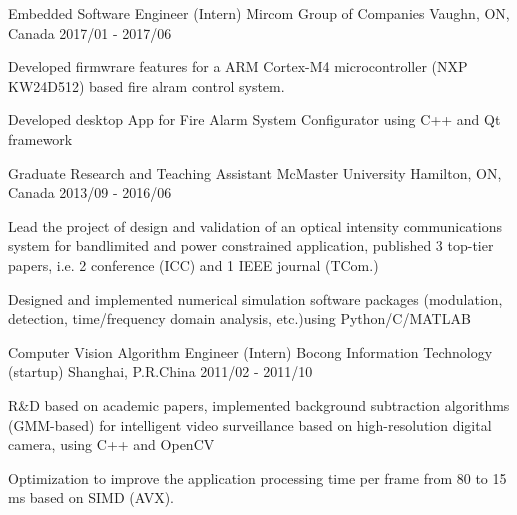 \begin{cventries}
\cventry
{Embedded Software Engineer (Intern)} %
{Mircom Group of Companies} %
{Vaughn, ON, Canada} %
{2017/01 - 2017/06} %
{ %
\begin{cvitems}
\item {Developed firmwrare features for a ARM Cortex-M4 microcontroller (NXP KW24D512) based fire alram control system.}
\item {Developed desktop App for Fire Alarm System Configurator using C++ and Qt framework}
\end{cvitems} 
}

\cventry
{Graduate Research and Teaching Assistant} %
{McMaster University} %
{Hamilton, ON, Canada} %
{2013/09 - 2016/06} %
{ %
\begin{cvitems}
\item {Lead the project of design and validation of an optical intensity communications system for bandlimited and power constrained application, published 3 top-tier papers, i.e. 2 conference (ICC) and 1 IEEE journal (TCom.)}
\item {Designed and implemented numerical simulation software packages (modulation, detection, time/frequency domain analysis, etc.)using Python/C/MATLAB}
\end{cvitems}
}

\cventry
{Computer Vision Algorithm Engineer (Intern)} %
{Bocong Information Technology (startup)} %
{Shanghai, P.R.China} %
{2011/02 - 2011/10} %
{ %
\begin{cvitems}
\item {R\&D based on academic papers, implemented background subtraction algorithms (GMM-based) for intelligent video surveillance based on high-resolution digital camera, using C++ and OpenCV}
\item {Optimization to improve the application processing time per frame from 80 to 15 ms based on SIMD (AVX).}
\end{cvitems}
}


%


\end{cventries}